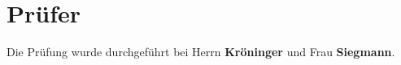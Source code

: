 \section{Prüfer}

Die Prüfung wurde durchgeführt bei Herrn \textbf{Kröninger} und Frau \textbf{Siegmann}.
